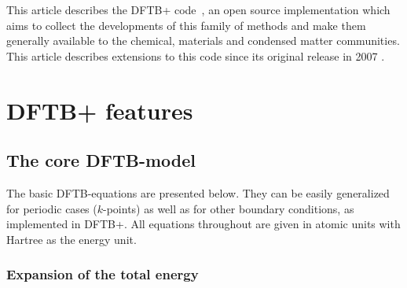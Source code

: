 \documentclass[reprint,onecolumn,superscriptaddress]{revtex4-1}
\newcommand{\dftbp}{DFTB+}
\begin{document}
This article describes the \dftbp{} code~\cite{dftbplus-repo}, an open source
implementation which aims to collect the developments of this family of methods
and make them generally available to the chemical, materials and condensed
matter communities. This article describes extensions to this code since its
original release in 2007 \cite{aradi-jpca-2007}.

\section{\dftbp{} features}

\subsection{The core DFTB-model}

The basic DFTB-equations are presented below. They can be easily generalized for
periodic cases ($k$-points) as well as for other boundary conditions, as
implemented in \dftbp{}. All equations throughout are given in atomic units with
Hartree as the energy unit.

\subsubsection{Expansion of the total energy}
\end{document}
